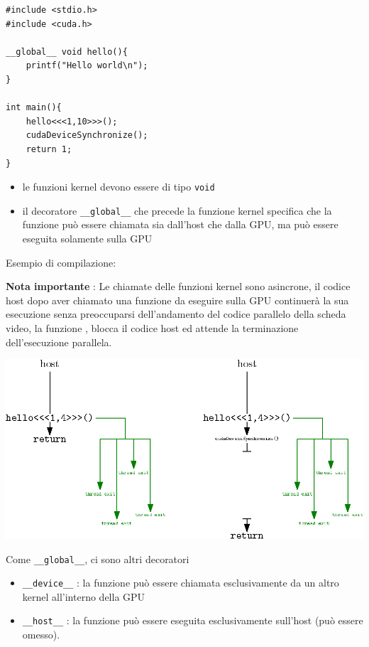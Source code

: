 \documentclass[10pt, letterpaper]{report}
\begin{document}
\begin{lstlisting}[style=CStyle]
#include <stdio.h>
#include <cuda.h> 

__global__ void hello(){
    printf("Hello world\n");
}

int main(){
    hello<<<1,10>>>();
    cudaDeviceSynchronize();
    return 1;
}
\end{lstlisting}\begin{itemize}
    \item le funzioni kernel devono essere di tipo \texttt{void} 
    \item il decoratore \texttt{\_\_global\_\_} che precede la funzione kernel specifica che la funzione può essere chiamata sia dall'host che dalla GPU, ma può essere eseguita solamente sulla GPU
\end{itemize}
Esempio di compilazione:\begin{quote}
\end{quote}
\textbf{Nota importante} : Le chiamate delle funzioni kernel sono asincrone, il codice host dopo aver chiamato una funzione da eseguire sulla GPU continuerà la sua esecuzione senza preoccuparsi dell'andamento del codice parallelo della scheda video, la funzione , blocca il codice host ed attende la terminazione dell'esecuzione parallela.\begin{center}
    \includegraphics[width=1\textwidth ]{images/CUDAsincronia.eps}
\end{center}
Come \texttt{\_\_global\_\_}, ci sono altri decoratori\begin{itemize}
    \item \texttt{\_\_device\_\_} : la funzione può essere chiamata esclusivamente da un altro kernel all'interno della GPU 
    \item \texttt{\_\_host\_\_} : la funzione può essere eseguita esclusivamente sull'host (può essere omesso).
\end{itemize}
\end{document}

